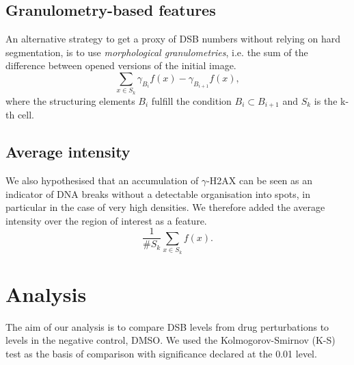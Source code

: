 \subsection{Granulometry-based features}

An alternative strategy to get a proxy of DSB numbers without relying on hard segmentation, is to use \emph{morphological granulometries}, i.e. the sum of the difference between opened versions of the initial image.
\begin{equation}
\sum_{x \in S_k} \gamma_{B_i}f(x) - \gamma_{B_{i+1}}f(x),
\end{equation}
where the structuring elements $B_i$ fulfill the condition $B_{i} \subset B_{i+1}$ and $S_k$ is the k-th cell.  

\subsection{Average intensity}

We also hypothesised that an accumulation of $\gamma$-H2AX can be seen as an indicator of DNA breaks without a detectable organisation into spots, in particular in the case of very high densities. We therefore added the average intensity over the region of interest as a feature.
\begin{equation}
\frac{1}{\#S_k}\sum_{x \in S_k}f(x).
\end{equation}

\section{Analysis}
\label{sec:analysis}

The aim of our analysis is to compare DSB levels from drug perturbations to levels in the negative control, DMSO. We used the Kolmogorov-Smirnov (K-S) test as the basis of comparison with significance declared at the 0.01 level.

